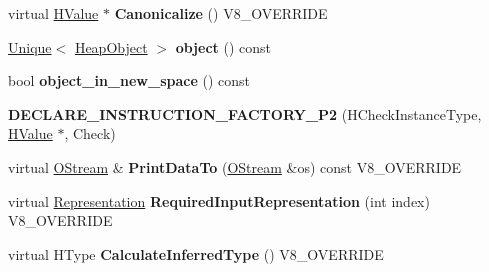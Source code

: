 \begin{DoxyCompactItemize}
\item 
\hypertarget{classv8_1_1internal_1_1_v8___f_i_n_a_l_aad5f871e0a6782c02e742ec017eca3cd}{}virtual \hyperlink{classv8_1_1internal_1_1_h_value}{H\+Value} $\ast$ {\bfseries Canonicalize} () V8\+\_\+\+O\+V\+E\+R\+R\+I\+D\+E\label{classv8_1_1internal_1_1_v8___f_i_n_a_l_aad5f871e0a6782c02e742ec017eca3cd}

\item 
\hypertarget{classv8_1_1internal_1_1_v8___f_i_n_a_l_a6388553257f07afd1efdf6adf7070476}{}\hyperlink{classv8_1_1internal_1_1_unique}{Unique}$<$ \hyperlink{classv8_1_1internal_1_1_heap_object}{Heap\+Object} $>$ {\bfseries object} () const \label{classv8_1_1internal_1_1_v8___f_i_n_a_l_a6388553257f07afd1efdf6adf7070476}

\item 
\hypertarget{classv8_1_1internal_1_1_v8___f_i_n_a_l_a017218f98d3f24af5d34219cb9951d70}{}bool {\bfseries object\+\_\+in\+\_\+new\+\_\+space} () const \label{classv8_1_1internal_1_1_v8___f_i_n_a_l_a017218f98d3f24af5d34219cb9951d70}

\item 
\hypertarget{classv8_1_1internal_1_1_v8___f_i_n_a_l_a32272dea45580327aa5d6d9cf947275b}{}{\bfseries D\+E\+C\+L\+A\+R\+E\+\_\+\+I\+N\+S\+T\+R\+U\+C\+T\+I\+O\+N\+\_\+\+F\+A\+C\+T\+O\+R\+Y\+\_\+\+P2} (H\+Check\+Instance\+Type, \hyperlink{classv8_1_1internal_1_1_h_value}{H\+Value} $\ast$, Check)\label{classv8_1_1internal_1_1_v8___f_i_n_a_l_a32272dea45580327aa5d6d9cf947275b}

\item 
\hypertarget{classv8_1_1internal_1_1_v8___f_i_n_a_l_ac450dad970b14246be761ccf5004924b}{}virtual \hyperlink{classv8_1_1internal_1_1_o_stream}{O\+Stream} \& {\bfseries Print\+Data\+To} (\hyperlink{classv8_1_1internal_1_1_o_stream}{O\+Stream} \&os) const V8\+\_\+\+O\+V\+E\+R\+R\+I\+D\+E\label{classv8_1_1internal_1_1_v8___f_i_n_a_l_ac450dad970b14246be761ccf5004924b}

\item 
\hypertarget{classv8_1_1internal_1_1_v8___f_i_n_a_l_a6c6d1f37f40b113d8f4062f1ffff7215}{}virtual \hyperlink{classv8_1_1internal_1_1_representation}{Representation} {\bfseries Required\+Input\+Representation} (int index) V8\+\_\+\+O\+V\+E\+R\+R\+I\+D\+E\label{classv8_1_1internal_1_1_v8___f_i_n_a_l_a6c6d1f37f40b113d8f4062f1ffff7215}

\item 
\hypertarget{classv8_1_1internal_1_1_v8___f_i_n_a_l_a7a6782b8660ab150601db2ff28262edd}{}virtual H\+Type {\bfseries Calculate\+Inferred\+Type} () V8\+\_\+\+O\+V\+E\+R\+R\+I\+D\+E\label{classv8_1_1internal_1_1_v8___f_i_n_a_l_a7a6782b8660ab150601db2ff28262edd}


\end{DoxyCompactItemize}
